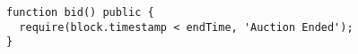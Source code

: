 \begin{lstlisting}[language=Solidity]
function bid() public {
  require(block.timestamp < endTime, 'Auction Ended');
}

\end{lstlisting}